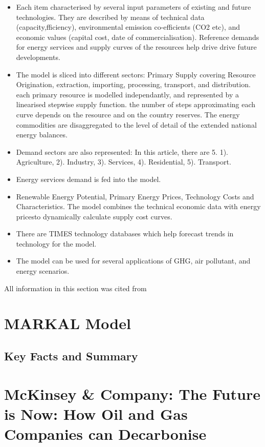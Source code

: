 \documentclass[12pt]{article}
\begin{document}
    \begin{itemize}
        \item Each item characterised by several input parameters of existing and future technologies.
              They are described by means of technical data (capacity,fficiency), environmental emission co-efficients (CO2 etc), 
              and economic values (capital cost, date of commercialisation). Reference demands for energy services and supply curves of 
              the resources help drive drive future developments.
        \item The model is sliced into different sectors: Primary Supply covering Resource Origination, extraction, importing, processing, transport, and distribution.
              each primary resource is modelled independantly, and represented by a linearised stepwise supply function.
              the number of steps approximating each curve depends on the resource and on the country reserves. The energy commodities are disaggregated to the level of detail
              of the extended national energy balances. 
        \item Demand sectors are also represented: In this article, there are 5. 1). Agriculture, 2). Industry, 3). Services, 4). Residential, 5). Transport.
        \item Energy services demand is fed into the model.
        \item Renewable Energy Potential, Primary Energy Prices, Technology Costs and Characteristics. 
              The model combines the technical economic data with energy pricesto dynamically calculate supply cost curves.
        \item There are TIMES technology databases which help forecast trends in technology for the model.
        \item The model can be used for several applications of GHG, air pollutant, and energy scenarios.
    \end{itemize}
    All information in this section was cited from \cite{A:1}
    \section{MARKAL Model}
    \subsection{Key Facts and Summary}
    \section{McKinsey \& Company: The Future is Now: How Oil and Gas Companies can Decarbonise}
\end{document}
